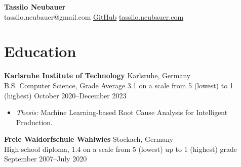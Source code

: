 \documentclass[letterpaper, 9pt]{article}
\newcommand{\header}[4]{
    \begin{center}
        \textbf{\Huge{#1}}\\
        \small{
            \textcolor{accent}{#2} \hspace{1em}
            \href{#3}{GitHub}\hspace{1em}
            \href{#4}{tassilo.neubauer.com}
        }
    \end{center}
}
\begin{document}
\header{Tassilo Neubauer}{tassilo.neubauer@gmail.com}{https://github.com/sonofhypnos}{https://www.tassiloneubauer.com/}

\section*{Education}
\textbf{Karlsruhe Institute of Technology} \hfill Karlsruhe, Germany \\
B.S. Computer Science, Grade Average 3.1 on a scale from 5 (lowest) to 1 (highest) \hfill October 2020--December 2023
\begin{itemize}
    \item \textit{Thesis:} Machine Learning-based Root Cause Analysis for Intelligent Production.
\end{itemize}
\textbf{Freie Waldorfschule Wahlwies} \hfill Stockach, Germany \\
High school diploma,  1.4 on a scale from 5 (lowest) up to 1 (highest) grade \hfill September 2007--July 2020
\end{document}
